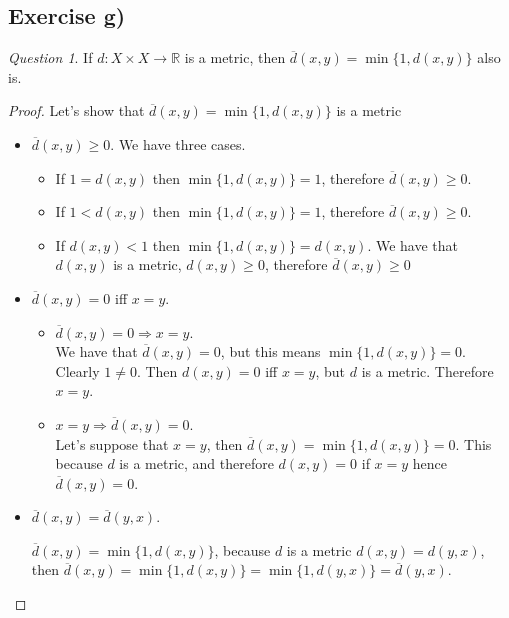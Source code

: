 \documentclass[11pt]{article}
\theoremstyle{definition}
\theoremstyle{remark}
\theoremstyle{remark}
\theoremstyle{remark}
\newtheorem*{question}{Question}
\begin{document}

\subsection*{Exercise g)}

\begin{question}
  If $d : X \times X \to \mathbb{R}$ is a metric, then
  $\overline{d}(x,y) = \min{\{1,d(x,y)\}}$ also is.
\end{question}
\begin{proof}
  Let's show that $\overline{d}(x,y) = \min{\{1,d(x,y)\}}$ is a metric
  \begin{itemize}
    \item $\overline{d}(x,y) \geq 0$. We have three cases.
      \begin{itemize}
        \item If $1 = d(x,y)$ then $\min{\{1,d(x,y)\}} = 1$, therefore
          $\overline{d}(x,y) \geq 0$.
        \item If $1 < d(x,y)$ then $\min{\{1,d(x,y)\}} = 1$, therefore
          $\overline{d}(x,y) \geq 0$.
        \item If $d(x,y) < 1$ then $\min{\{1,d(x,y)\}} = d(x,y)$. We have that
          $d(x,y)$ is a metric, $d(x,y) \geq 0$, therefore
          $\overline{d}(x,y) \geq 0$
      \end{itemize}
    \item $\overline{d}(x,y) = 0$ iff $x = y$.
      \begin{itemize}
        \item $\overline{d}(x,y) = 0 \Rightarrow x = y$. \\

          We have that $\overline{d}(x,y) = 0$, but this means
          $\min{\{1,d(x,y)\}} = 0$. Clearly $1 \neq 0$. Then $d(x,y) = 0$ iff
          $x = y$, but $d$ is a metric. Therefore $x = y$.
          \item $x = y \Rightarrow \overline{d}(x,y) = 0$. \\

          Let's suppose that $x = y$, then
          $\overline{d}(x,y) = \min{\{1,d(x,y)\}} = 0$. This because $d$ is a
          metric, and therefore $d(x,y) = 0$ if $x = y$ hence
          $\overline{d}(x,y) = 0$.
    \end{itemize}
    \item $\overline{d}(x,y) = \overline{d}(y,x)$.

      $\overline{d}(x,y) = \min{\{1,d(x,y)\}}$, because $d$ is a metric
      $d(x,y) = d(y,x)$, then
      $\overline{d}(x,y) = \min{\{1,d(x,y)\}} = \min{\{1,d(y,x)\}} = \overline{d}(y,x)$.


\end{itemize}
\end{proof}
\end{document}
